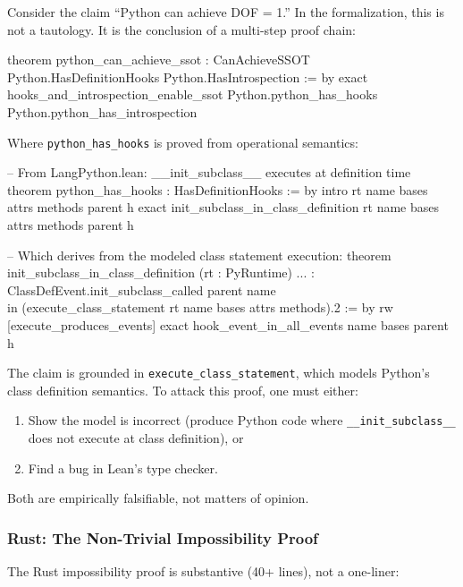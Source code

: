 Consider the claim ``Python can achieve DOF = 1.'' In the formalization, this is not a tautology. It is the conclusion of a multi-step proof chain:

\begin{code}
theorem python_can_achieve_ssot :
    CanAchieveSSOT Python.HasDefinitionHooks Python.HasIntrospection := by
  exact hooks_and_introspection_enable_ssot
    Python.python_has_hooks
    Python.python_has_introspection
\end{code}

Where \texttt{python\_has\_hooks} is proved from operational semantics:

\begin{code}
-- From LangPython.lean: __init_subclass__ executes at definition time
theorem python_has_hooks : HasDefinitionHooks := by
  intro rt name bases attrs methods parent h
  exact init_subclass_in_class_definition rt name bases attrs methods parent h

-- Which derives from the modeled class statement execution:
theorem init_subclass_in_class_definition (rt : PyRuntime) ... :
    ClassDefEvent.init_subclass_called parent name \\in
    (execute_class_statement rt name bases attrs methods).2 := by
  rw [execute_produces_events]
  exact hook_event_in_all_events name bases parent h
\end{code}

The claim is grounded in \texttt{execute\_class\_statement}, which models Python's class definition semantics. To attack this proof, one must either:
\begin{enumerate}
\item Show the model is incorrect (produce Python code where \texttt{\_\_init\_subclass\_\_} does not execute at class definition), or
\item Find a bug in Lean's type checker.
\end{enumerate}

Both are empirically falsifiable, not matters of opinion.

\subsubsection{Rust: The Non-Trivial Impossibility Proof}

The Rust impossibility proof is substantive (40+ lines), not a one-liner:

